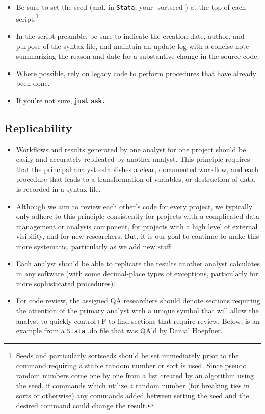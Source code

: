 \documentclass[11pt]{article}
\begin{document}
\begin{itemize}
	\item Be sure to set the seed (and, in \texttt{Stata}, your -sortseed-) at the top of each script.\footnote{Seeds and particularly sortseeds should be set immediately prior to the command requiring a stable random number or sort is used. Since pseudo random numbers come one by one from a list created by an algorithm using the seed, if commands which utilize a random number (for breaking ties in sorts or otherwise) any commands added between setting the seed and the desired command could change the result.}
	\item In the script preamble, be sure to indicate the creation date, author, and purpose of the syntax file, and maintain an update log with a concise note summarizing the reason and date for a substantive change in the source code.
	\item Where possible, rely on legacy code to perform procedures that have already been done.
	\item If you're not sure, \bf{just ask}.
\end{itemize}

\subsection{Replicability}
\begin{itemize}
	\item Workflows and results generated by one analyst for one project should be easily and accurately replicated by another analyst. This principle requires that the principal analyst establishes a clear, documented workflow, and each procedure that leads to a transformation of variables, or destruction of data, is recorded in a syntax file.
	\item Although we aim to review each other's code for every project, we typically only adhere to this principle consistently for projects with a complicated data management or analysis component, for projects with a high level of external visibility, and for new researchers. But, it is our goal to continue to make this more systematic, particularly as we add new staff.
	\item Each analyst should be able to replicate the results another analyst calculates in any software (with some decimal-place types of exceptions, particularly for more sophisticated procedures).
	\item For code review, the assigned QA researchers should denote sections requiring the attention of the primary analyst with a unique symbol that will allow the analyst to quickly control+F to find sections that require review. Below, is an example from a \texttt{Stata} .do file that was QA'd by Danial Hoepfner.
\end{itemize}
\end{document}

